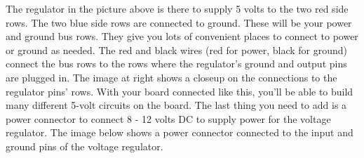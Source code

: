 The regulator in the picture above is there to supply 5 volts to the two red side rows. The two blue side rows are connected to ground. These will be your power and ground bus rows. They give you lots of convenient places to connect to power or ground as needed. The red and black wires (red for power, black for ground) connect the bus rows to the rows where the regulator's ground and output pins are plugged in. The image at right shows a closeup on the connections to the regulator pins' rows.
With your board connected like this, you'll be able to build many different 5-volt circuits on the board. The last thing you need to add is a power connector to connect 8 - 12 volts DC to supply power for the voltage regulator. The image below shows a power connector connected to the input and ground pins of the voltage regulator.
